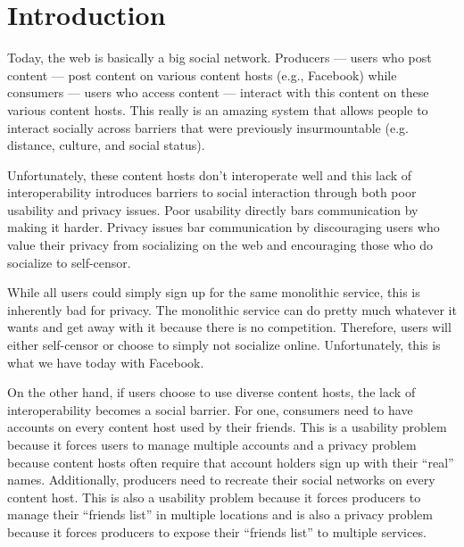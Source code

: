 \documentclass[pdftex,12pt,a4papaer,twoside,notitlepage]{report}
\begin{document}
\restoregeometry

\cleardoublepage

\tableofcontents

\cleardoublepage

\setlength{\parskip}{1.5em}
                                              
\chapter{Introduction} 

Today, the web is basically a big social network. Producers --- users who post
content --- post content on various content hosts (e.g., Facebook) while
consumers --- users who access content --- interact with this content on these
various content hosts. This really is an amazing system that allows people to
interact socially across barriers that were previously insurmountable (e.g.
distance, culture, and social status).

Unfortunately, these content hosts don't interoperate well and this lack of
interoperability introduces barriers to social interaction through both poor
usability and privacy issues. Poor usability directly bars communication by
making it harder. Privacy issues bar communication by discouraging users who
value their privacy from socializing on the web and encouraging those who do
socialize to self-censor.

While all users could simply sign up for the same monolithic service, this is
inherently bad for privacy. The monolithic service can do pretty much whatever
it wants and get away with it because there is no competition. Therefore, users
will either self-censor or choose to simply not socialize online. Unfortunately,
this is what we have today with Facebook.

On the other hand, if users choose to use diverse content hosts, the lack of
interoperability becomes a social barrier. For one, consumers need to have
accounts on every content host used by their friends. This is a usability
problem because it forces users to manage multiple accounts and a privacy
problem because content hosts often require that account holders sign up with
their ``real'' names. Additionally, producers need to recreate their social
networks on every content host. This is also a usability problem because it
forces producers to manage their ``friends list'' in multiple locations and is
also a privacy problem because it forces producers to expose their ``friends
list'' to multiple services.
\end{document}
